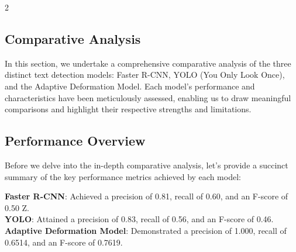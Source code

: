 \documentclass[sn-mathphys,Numbered]{sn-jnl}%
\begin{document}
\begin{multicols}{2}
\subsection{Comparative Analysis}
\label{Comparative Analysis}
In this section, we undertake a comprehensive comparative analysis of the three distinct text detection models: Faster R-CNN, YOLO (You Only Look Once), and the Adaptive Deformation Model. Each model's performance and characteristics have been meticulously assessed, enabling us to draw meaningful comparisons and highlight their respective strengths and limitations.

\subsection{Performance Overview}

Before we delve into the in-depth comparative analysis, let's provide a succinct summary of the key performance metrics achieved by each model:

\textbf{Faster R-CNN}: Achieved a precision of 0.81, recall of 0.60, and an F-score of 0.50
Z. \\
\textbf{YOLO}: Attained a precision of 0.83, recall of 0.56, and an F-score of 0.46. \\
\textbf{Adaptive Deformation Model}: Demonstrated a precision of 1.000, recall of 0.6514, and an F-score of 0.7619.




\end{multicols}
\end{document}
